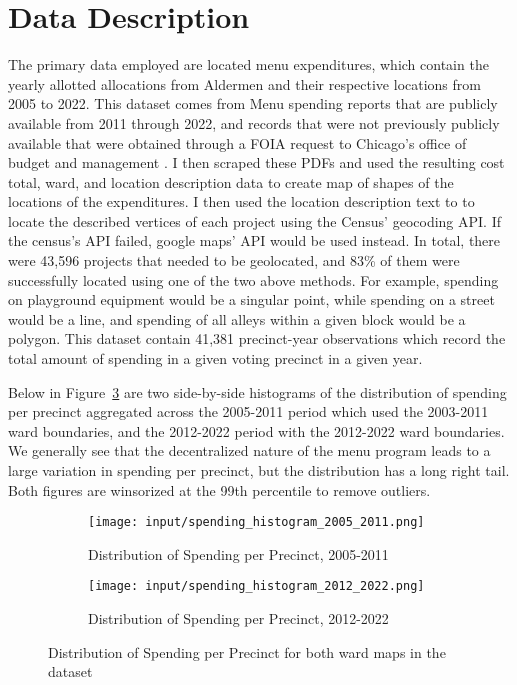 \section*{Data Description}
The primary data employed are located menu expenditures, which contain the yearly allotted allocations from Aldermen and their respective locations from 2005 to 2022.
This dataset comes from Menu spending reports that are publicly available from 2011 through 2022, and records that were not previously publicly available that were obtained through a FOIA request to Chicago's office of budget and management \cite{OBM_datasource}.  
I then scraped these PDFs and used the resulting cost total, ward, and location description data to create map of shapes of the locations of the expenditures.
I then used the location description text to to locate the described vertices of each project using the Census' geocoding API. 
If the census's API failed, google maps' API would be used instead.
In total, there were 43,596 projects that needed to be geolocated, and 83\% of them were successfully located using one of the two above methods.
For example, spending on playground equipment would be a singular point, while spending on a street would be a line, and spending of all alleys within a given block would be a polygon.
This dataset contain 41,381 precinct-year observations which record the total amount of spending in a given voting precinct in a given year.

Below in Figure~\ref*{fig:spending_hist} are two side-by-side histograms of the distribution of spending per precinct aggregated across the 2005-2011 period which used the 2003-2011 ward boundaries, and the 2012-2022 period with the 2012-2022 ward boundaries.
We generally see that the decentralized nature of the menu program leads to a large variation in spending per precinct, but the distribution has a long right tail.
Both figures are winsorized at the 99th percentile to remove outliers.

\begin{figure}[H]
    \centering
    \begin{subfigure}[b]{0.45\textwidth} %
      \texttt{[image: input/spending\_histogram\_2005\_2011.png]}
      \caption{Distribution of Spending per Precinct, 2005-2011}
      \label{fig:sub1}
    \end{subfigure}
    \hfill %
    \begin{subfigure}[b]{0.45\textwidth}
      \texttt{[image: input/spending\_histogram\_2012\_2022.png]}
      \caption{Distribution of Spending per Precinct, 2012-2022}
      \label{fig:sub2}
    \end{subfigure}
  
    \caption{Distribution of Spending per Precinct for both ward maps in the dataset}
    \label{fig:spending_hist}
  \end{figure}

